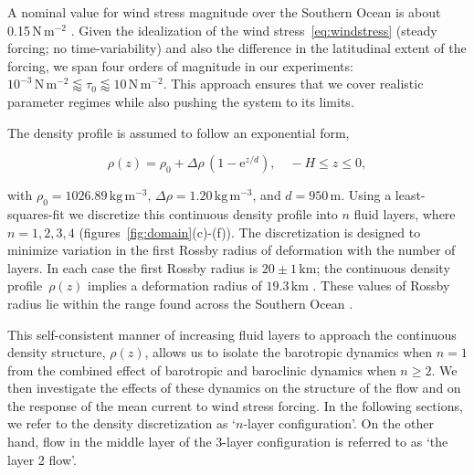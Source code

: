 \documentclass{agujournal2019}
\newcommand{\ee}		{\mathrm{e}}
\renewcommand{\equiv} {\ensuremath{\stackrel{\mathrm{def}}{=}}}
\newcommand{\Pa}		{\mathrm{N}\,\mathrm{m}^{-2}}
\begin{document}
A nominal value for wind stress magnitude over the Southern Ocean is about 0.15$\,\Pa$ \cite{Risien-Chelton-2008}. Given the idealization of the wind stress~\eqref{eq:windstress} (steady forcing; no time-variability) and also the difference in the latitudinal extent of the forcing, we span four orders of magnitude in our experiments: $10^{-3}\,\Pa\lessapprox \tau_0\lessapprox 10\,\Pa$. This approach ensures that we cover realistic parameter regimes while also pushing the system to its limits.



The density profile is assumed to follow an exponential form,
\begin{linenomath*}
\begin{equation}
\rho(z) = \rho_0+ \Delta\rho \, (1-\ee^{z/d}),\quad -H\le z\le 0,
\end{equation} 
\end{linenomath*} 
with $\rho_0=1026.89\,\mathrm{kg}\,\mathrm{m}^{-3}$, $\Delta\rho=1.20\,\mathrm{kg}\,\mathrm{m}^{-3}$, and $d=950\,\mathrm{m}$.  Using a least-squares-fit%
we discretize this continuous density profile into $n$ fluid layers, where $n=1,2,3,4$ (figures~\ref{fig:domain}\mbox{(c)-(f)}). 
The discretization is designed to minimize variation in the first Rossby radius of deformation  with the number of layers.
In each case the first Rossby radius is  $20\pm 1\,\mathrm{km}$; the continuous density profile~$\rho(z)$ implies a deformation radius of $19.3\,\mathrm{km}$ \cite{LaCasce-2012}. These values of Rossby radius lie within the range found across the Southern Ocean \cite{Chelton-etal-1998}. 

This self-consistent manner of increasing fluid layers to approach the continuous density structure, $\rho(z)$, allows us to isolate the barotropic dynamics {\color{black} when $n=1$ from the combined effect of barotropic and baroclinic dynamics when $n\ge 2$}. We then  investigate the effects of these dynamics on the structure of the flow and on the response of the mean current to wind stress forcing. In the following sections, we refer to the  density discretization as `$n$-layer configuration'. On the other hand, flow in the middle layer of the 3-layer configuration is referred to as `the layer 2 flow'.
\end{document}
